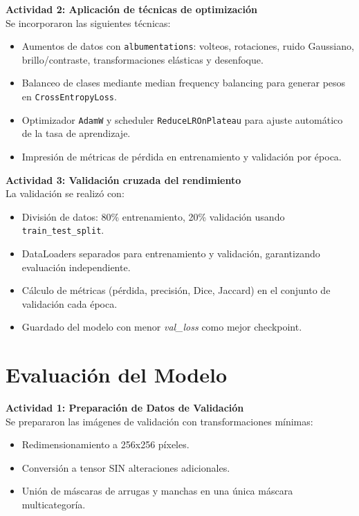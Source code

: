 \textbf{Actividad 2: Aplicación de técnicas de optimización}\\
Se incorporaron las siguientes técnicas:
\begin{itemize}
  \item Aumentos de datos con \texttt{albumentations}: volteos, rotaciones, ruido Gaussiano, brillo/contraste, transformaciones elásticas y desenfoque.  
  \item Balanceo de clases mediante median frequency balancing para generar pesos en \texttt{CrossEntropyLoss}.  
  \item Optimizador \texttt{AdamW} y scheduler \texttt{ReduceLROnPlateau} para ajuste automático de la tasa de aprendizaje.  
  \item Impresión de métricas de pérdida en entrenamiento y validación por época.  
\end{itemize}

\textbf{Actividad 3: Validación cruzada del rendimiento}\\
La validación se realizó con:
\begin{itemize}
  \item División de datos: 80\% entrenamiento, 20\% validación usando \texttt{train\_test\_split}.  
  \item DataLoaders separados para entrenamiento y validación, garantizando evaluación independiente.  
  \item Cálculo de métricas (pérdida, precisión, Dice, Jaccard) en el conjunto de validación cada época.  
  \item Guardado del modelo con menor \emph{val\_loss} como mejor checkpoint.  
\end{itemize}


\section{Evaluación del Modelo}

\textbf{Actividad 1: Preparación de Datos de Validación}\\
Se prepararon las imágenes de validación con transformaciones mínimas:
\begin{itemize}
  \item Redimensionamiento a 256x256 píxeles.  
  \item Conversión a tensor SIN alteraciones adicionales.  
  \item Unión de máscaras de arrugas y manchas en una única máscara multicategoría.  
\end{itemize}

